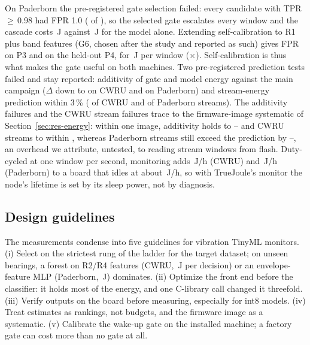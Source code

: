 \documentclass[conference]{IEEEtran}
\newcommand{\uJ}{\,\textmu J}
\newcommand{\TJ}{TrueJoule}
\begin{document}
On Paderborn the pre-registered gate selection failed: every candidate with TPR\,$\geq$\,0.98 had FPR 1.0
(\NumCasPuRuleNPass{} of \NumCasPuRuleNGates{}), so the selected gate escalates every window and the cascade costs
\NumCasPuRuleE\uJ{} against \NumCasPuModelE\uJ{} for the model alone. Extending self-calibration to R1 plus band
features (G6, chosen after the study and reported as such) gives FPR \NumCasPuSixNOneTwoEightFprPThree{} on P3 and
\NumCasPuSixNOneTwoEightFprPFour{} on the held-out P4, for \NumCasEpiPuGSix\uJ{} per window
(\NumCasPuSaving$\times$). Self-calibration is thus what makes the gate useful on both machines. Two pre-registered
prediction tests failed and stay reported: additivity of gate and model energy against the main campaign ($\Delta$
down to \NumCwruRqThreeMin{} on CWRU and \NumPuRqThreeMin{} on Paderborn) and stream-energy prediction within 3\,\%
(\NumCwruRqFourFail{} of \NumCwruRqFourN{} CWRU and \NumPuRqFourFail{} of \NumPuRqFourN{} Paderborn streams). The
additivity failures and the CWRU stream failures trace to the firmware-image systematic of
Section~\ref{sec:res-energy}: within one image, additivity holds to \NumCwruRqThreeInMin--\NumCwruRqThreeInMax{} and
CWRU streams to within \NumCwruRqFourInMax{}, whereas Paderborn streams still exceed the prediction by
\NumPuRqFourInMin--\NumPuRqFourInMax{}, an overhead we attribute, untested, to reading stream windows from flash.
Duty-cycled at one window per second, monitoring adds \NumCwruIncJhOneS\,J/h (CWRU) and \NumPuIncJhOneS\,J/h
(Paderborn) to a board that idles at about \NumCwruIdleJh\,J/h, so with \TJ{}'s monitor the node's lifetime is set by
its sleep power, not by diagnosis.

\subsection{Design guidelines}\label{sec:guide}
The measurements condense into five guidelines for vibration TinyML monitors. (i) Select on the strictest rung of the
ladder for the target dataset; on unseen bearings, a forest on R2/R4 features (CWRU, \NumCwruPThreeBestE\uJ{} per
decision) or an envelope-feature MLP (Paderborn, \NumPuPThreeBestE\uJ{}) dominates. (ii) Optimize the front end before
the classifier: it holds most of the energy, and one C-library call changed it threefold. (iii) Verify outputs on the
board before measuring, especially for int8 models. (iv) Treat estimates as rankings, not budgets, and the firmware
image as a systematic. (v) Calibrate the wake-up gate on the installed machine; a factory gate can cost more than no
gate at all.
\end{document}
